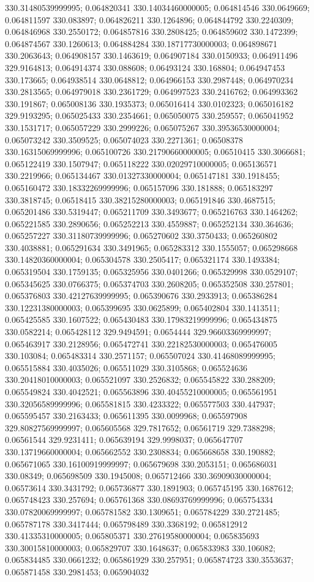 330.31480539999995; 0.064820341 330.14034460000005; 0.064814546 330.0649669; 0.064811597 330.083897; 0.064826211 330.1264896; 0.064844792 330.2240309; 0.064846968 330.2550172; 0.064857816 330.2808425; 0.064859602 330.1472399; 0.064874567 330.1260613; 0.064884284 330.18717730000003; 0.064898671 330.2063643; 0.064908157 330.1463619; 0.064907184 330.0150933; 0.064911496 329.9164813; 0.064914374 330.088608; 0.06493124 330.168804; 0.064947453 330.173665; 0.064938514 330.0648812; 0.064966153 330.2987448; 0.064970234 330.2813565; 0.064979018 330.2361729; 0.064997523 330.2416762; 0.064993362 330.191867; 0.065008136 330.1935373; 0.065016414 330.0102323; 0.065016182 329.9193295; 0.065025433 330.2354661; 0.065050075 330.259557; 0.065041952 330.1531717; 0.065057229 330.2999226; 0.065075267 330.39536530000004; 0.065073242 330.3509525; 0.065074023 330.2271361; 0.06508378 330.16315069999996; 0.065100726 330.21790660000005; 0.06510415 330.3066681; 0.065122419 330.1507947; 0.065118222 330.02029710000005; 0.065136571 330.2219966; 0.065134467 330.01327330000004; 0.065147181 330.1918455; 0.065160472 330.18332269999996; 0.065157096 330.181888; 0.065183297 330.3818745; 0.06518415 330.38215280000003; 0.065191846 330.4687515; 0.065201486 330.5319447; 0.065211709 330.3493677; 0.065216763 330.1464262; 0.065221585 330.2890656; 0.065252213 330.4559887; 0.065252134 330.364636; 0.065257227 330.31180739999996; 0.065270602 330.3750433; 0.065260802 330.4038881; 0.065291634 330.3491965; 0.065283312 330.1555057; 0.065298668 330.14820360000004; 0.065304578 330.2505417; 0.065321174 330.1493384; 0.065319504 330.1759135; 0.065325956 330.0401266; 0.065329998 330.0529107; 0.065345625 330.0766375; 0.065374703 330.2608205; 0.065352508 330.257801; 0.065376803 330.42127639999995; 0.065390676 330.2933913; 0.065386284 330.12231380000003; 0.065399695 330.0625899; 0.065402804 330.1413511; 0.065425585 330.1607522; 0.065430483 330.17983219999996; 0.065434875 330.0582214; 0.065428112 329.9494591; 0.0654444 329.96603369999997; 0.065463917 330.2128956; 0.065472741 330.22182530000003; 0.065476005 330.103084; 0.065483314 330.2571157; 0.065507024 330.41468089999995; 0.065515884 330.4035026; 0.065511029 330.3105868; 0.065524636 330.20418010000003; 0.065521097 330.2526832; 0.065545822 330.288209; 0.065549824 330.4042521; 0.065563896 330.40455210000005; 0.065561951 330.32056589999996; 0.065581815 330.4233322; 0.065577503 330.447937; 0.065595457 330.2163433; 0.065611395 330.0099968; 0.065597908 329.80827569999997; 0.065605568 329.7817652; 0.06561719 329.7388298; 0.06561544 329.9231411; 0.065639194 329.9998037; 0.065647707 330.13719660000004; 0.065662552 330.2308834; 0.065668658 330.190882; 0.065671065 330.16100919999997; 0.065679698 330.2053151; 0.065686031 330.08349; 0.065698509 330.1945008; 0.065712466 330.36909030000004; 0.06573614 330.3431792; 0.065736877 330.1891903; 0.065745195 330.1687612; 0.065748423 330.257694; 0.065761368 330.08693769999996; 0.065754334 330.07820069999997; 0.065781582 330.1309651; 0.065784229 330.2721485; 0.065787178 330.3417444; 0.065798489 330.3368192; 0.065812912 330.41335310000005; 0.065805371 330.27619580000004; 0.065835693 330.30015810000003; 0.065829707 330.1648637; 0.065833983 330.106082; 0.065834485 330.0661232; 0.065861929 330.257951; 0.065874723 330.3553637; 0.065871458 330.2981453; 0.065904032 